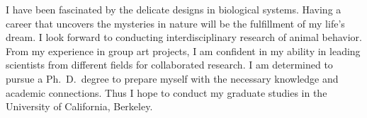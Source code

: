 \documentclass[a4paper, 12pt]{article}
\begin{document}
\vspace*{-1.2ex} 
I have been fascinated by the delicate designs in biological systems.  Having a career that uncovers the mysteries in nature will be the fulfillment of my life's dream.  I look forward to conducting interdisciplinary research of animal behavior.  From my experience in group art projects, I am confident in my ability in leading scientists from different fields for collaborated research. I am determined to pursue a Ph.~D.~degree to prepare myself with the necessary knowledge and academic connections. Thus I hope to conduct my graduate studies in the University of California, Berkeley.\\
%
\end{document}
